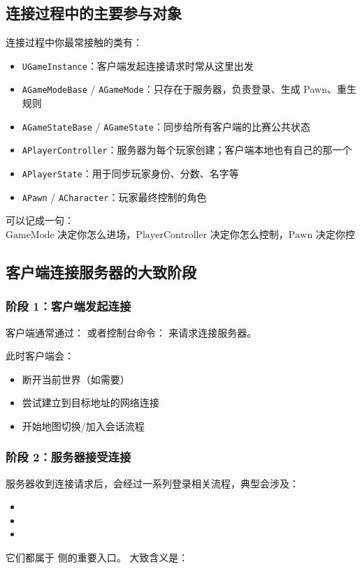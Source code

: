 \subsection{连接过程中的主要参与对象}

连接过程中你最常接触的类有：

\begin{itemize}
	\item \texttt{UGameInstance}：客户端发起连接请求时常从这里出发
	\item \texttt{AGameModeBase} / \texttt{AGameMode}：只存在于服务器，负责登录、生成 Pawn、重生规则
	\item \texttt{AGameStateBase} / \texttt{AGameState}：同步给所有客户端的比赛公共状态
	\item \texttt{APlayerController}：服务器为每个玩家创建；客户端本地也有自己的那一个
	\item \texttt{APlayerState}：用于同步玩家身份、分数、名字等
	\item \texttt{APawn} / \texttt{ACharacter}：玩家最终控制的角色
\end{itemize}

可以记成一句：
$
\text{GameMode 决定你怎么进场，PlayerController 决定你怎么控制，Pawn 决定你控制谁}
$


\subsection{客户端连接服务器的大致阶段}

\subsubsection{阶段 1：客户端发起连接}
客户端通常通过：
或者控制台命令：	
来请求连接服务器。

此时客户端会：
\begin{itemize}
	\item 断开当前世界（如需要）
	\item 尝试建立到目标地址的网络连接
	\item 开始地图切换/加入会话流程
\end{itemize}


\subsubsection{阶段 2：服务器接受连接}
服务器收到连接请求后，会经过一系列登录相关流程，典型会涉及：
\begin{itemize}
	\item {}
	\item {}
	\item {}
\end{itemize}
它们都属于  侧的重要入口。
大致含义是：

